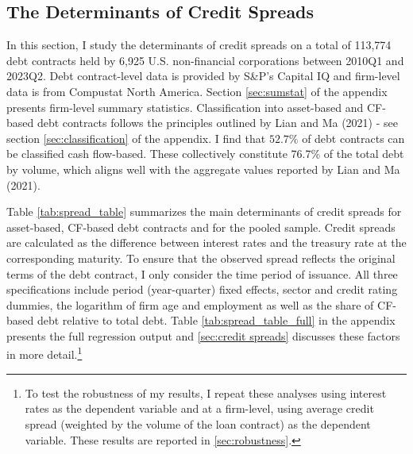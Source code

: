 \documentclass[12pt]{article}
\begin{document}
\subsection{The Determinants of Credit Spreads \label{sec:emp liqrisk}} 

In this section, I study the determinants of credit spreads on a total of 113,774 debt contracts held by 6,925 U.S. non-financial corporations between 2010Q1 and 2023Q2. Debt contract-level data is provided by S\&P's Capital IQ and firm-level data is from Compustat North America. Section \ref{sec:sumstat} of the appendix presents firm-level summary statistics. Classification into asset-based and CF-based debt contracts follows the principles outlined by Lian and Ma (2021) - see section \ref{sec:classification} of the appendix. I find that $52.7\%$ of debt contracts can be classified cash flow-based. These collectively constitute 76.7\% of the total debt by volume, which aligns well with the aggregate values reported by Lian and Ma (2021).
 
Table \ref{tab:spread_table} summarizes the main determinants of credit spreads for asset-based, CF-based debt contracts and for the pooled sample. Credit spreads are calculated as the difference between interest rates and the treasury rate at the corresponding maturity. To ensure that the observed spread reflects the original terms of the debt contract, I only consider the time period of issuance. All three specifications include period (year-quarter) fixed effects, sector and credit rating dummies, the logarithm of firm age and employment as well as the share of CF-based debt relative to total debt. Table \ref{tab:spread_table_full} in the appendix presents the full regression output and \ref{sec:credit spreads} discusses these factors in more detail.\footnote{To test the robustness of my results, I repeat these analyses using interest rates as the dependent variable and at a firm-level, using average credit spread (weighted by the volume of the loan contract) as the dependent variable. These results are reported in \ref{sec:robustness}.}
\end{document}
